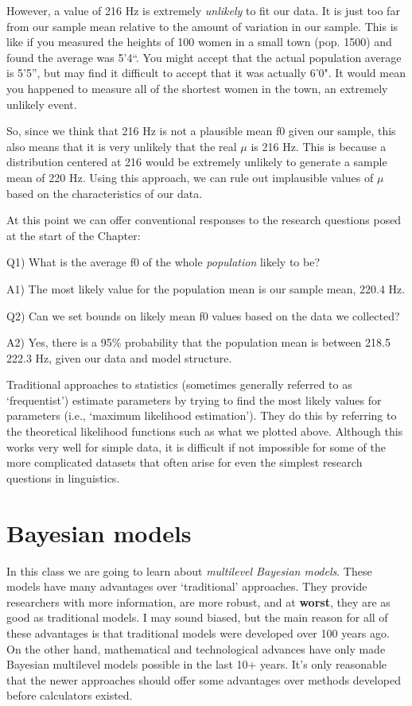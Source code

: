 \documentclass[
]{book}
\begin{document}
However, a value of 216 Hz is extremely \emph{unlikely} to fit our data. It is just too far from our sample mean relative to the amount of variation in our sample. This is like if you measured the heights of 100 women in a small town (pop. 1500) and found the average was 5'4``. You might accept that the actual population average is 5'5'', but may find it difficult to accept that it was actually 6'0". It would mean you happened to measure all of the shortest women in the town, an extremely unlikely event.

So, since we think that 216 Hz is not a plausible mean f0 given our sample, this also means that it is very unlikely that the real \(\mu\) is 216 Hz. This is because a distribution centered at 216 would be extremely unlikely to generate a sample mean of 220 Hz. Using this approach, we can rule out implausible values of \(\mu\) based on the characteristics of our data.

At this point we can offer conventional responses to the research questions posed at the start of the Chapter:

Q1) What is the average f0 of the whole \emph{population} likely to be?

A1) The most likely value for the population mean is our sample mean, 220.4 Hz.

Q2) Can we set bounds on likely mean f0 values based on the data we collected?

A2) Yes, there is a 95\% probability that the population mean is between 218.5 222.3 Hz, given our data and model structure.

Traditional approaches to statistics (sometimes generally referred to as `frequentist') estimate parameters by trying to find the most likely values for parameters (i.e., `maximum likelihood estimation'). They do this by referring to the theoretical likelihood functions such as what we plotted above. Although this works very well for simple data, it is difficult if not impossible for some of the more complicated datasets that often arise for even the simplest research questions in linguistics.

\hypertarget{bayesian-models}{%
\section{Bayesian models}\label{bayesian-models}}

In this class we are going to learn about \emph{multilevel Bayesian models}. These models have many advantages over `traditional' approaches. They provide researchers with more information, are more robust, and at \textbf{worst}, they are as good as traditional models. I may sound biased, but the main reason for all of these advantages is that traditional models were developed over 100 years ago. On the other hand, mathematical and technological advances have only made Bayesian multilevel models possible in the last 10+ years. It's only reasonable that the newer approaches should offer some advantages over methods developed before calculators existed.
\end{document}
